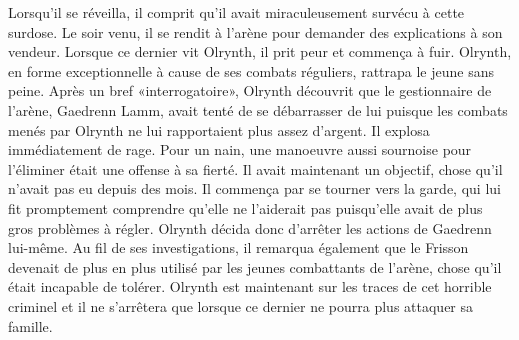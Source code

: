 \documentclass[main.tex]{subfiles}
\begin{document}
    Lorsqu'il se réveilla, il comprit qu'il avait miraculeusement survécu à cette surdose.
    Le soir venu, il se rendit à l'arène pour demander des explications à son vendeur.
    Lorsque ce dernier vit Olrynth, il prit peur et commença à fuir.
    Olrynth, en forme exceptionnelle à cause de ses combats réguliers, rattrapa le jeune sans peine.
    Après un bref «interrogatoire», Olrynth découvrit que le gestionnaire de l'arène, Gaedrenn Lamm, avait tenté de se débarrasser de lui puisque les combats menés par Olrynth ne lui rapportaient plus assez d'argent. 
    Il explosa immédiatement de rage.
    Pour un nain, une manoeuvre aussi sournoise pour l'éliminer était une offense à sa fierté. 
    Il avait maintenant un objectif, chose qu'il n'avait pas eu depuis des mois.
    Il commença par se tourner vers la garde, qui lui fit promptement comprendre qu'elle ne l'aiderait pas puisqu'elle avait de plus gros problèmes à régler.
    Olrynth décida donc d'arrêter les actions de Gaedrenn lui-même.
    Au fil de ses investigations, il remarqua également que le Frisson devenait de plus en plus utilisé par les jeunes combattants de l'arène, chose qu'il était incapable de tolérer.
    Olrynth est maintenant sur les traces de cet horrible criminel et il ne s'arrêtera que lorsque ce dernier ne pourra plus attaquer sa famille.
\end{document}
